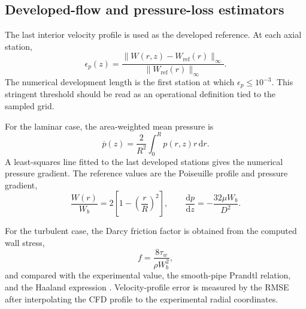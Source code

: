 \subsection{Developed-flow and pressure-loss estimators}

The last interior velocity profile is used as the developed reference. At each axial station,
\begin{equation}
\epsilon_p(z)=\frac{\|W(r,z)-W_{\mathrm{ref}}(r)\|_\infty}
{\|W_{\mathrm{ref}}(r)\|_\infty}.
\end{equation}
The numerical development length is the first station at which $\epsilon_p\leq10^{-3}$. This stringent threshold should be read as an operational definition tied to the sampled grid.

For the laminar case, the area-weighted mean pressure is
\begin{equation}
\overline{p}(z)=\frac{2}{R^2}\int_0^R p(r,z)r\,\mathrm{d}r.
\end{equation}
A least-squares line fitted to the last developed stations gives the numerical pressure gradient. The reference values are the Poiseuille profile and pressure gradient,
\begin{equation}
\frac{W(r)}{W_b}=2\left[1-\left(\frac{r}{R}\right)^2\right],
\qquad
\frac{\mathrm{d}p}{\mathrm{d}z}=-\frac{32\mu W_b}{D^2}.
\end{equation}

For the turbulent case, the Darcy friction factor is obtained from the computed wall stress,
\begin{equation}
f=\frac{8\tau_w}{\rho W_b^2},
\end{equation}
and compared with the experimental value, the smooth-pipe Prandtl relation, and the Haaland expression \cite{haaland1983}. Velocity-profile error is measured by the RMSE after interpolating the CFD profile to the experimental radial coordinates.
